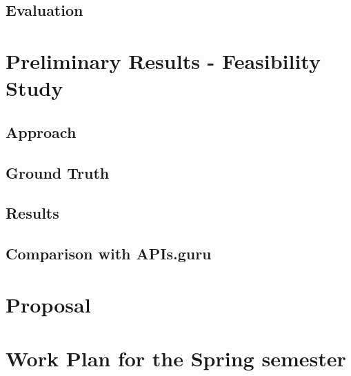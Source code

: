 \documentclass{layout/si-msc-proposal}
\begin{document}
    \subsection{Evaluation}\label{subsec:evaluation}
    



    \section{Preliminary Results - Feasibility Study}\label{sec:preliminary-results---feasibility-study}
    

    \subsection{Approach}\label{subsec:approach}
    

    \subsection{Ground Truth}\label{subsec:ground-truth}

    \subsection{Results}\label{subsec:results}
    

    \subsection{Comparison with APIs.guru}\label{subsec:comparison-with-apis.guru}


    \section{Proposal}\label{sec:proposal}


    \section{Work Plan for the Spring semester}\label{sec:work-plan-for-the-spring-semester}
    


    \newpage
    \nocite{*}
    
\end{document}
